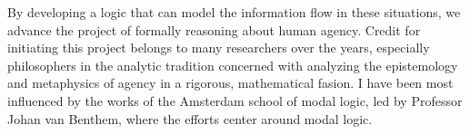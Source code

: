 By developing a logic that can model the information flow in these situations, we advance the project of formally reasoning about human agency. Credit for initiating this project belongs to many researchers over the years, especially philosophers in the analytic tradition concerned with analyzing the epistemology and metaphysics of agency in a rigorous, mathematical fasion. I have been most influenced by the works of the Amsterdam school of modal logic, led by Professor Johan van Benthem, where the efforts center around modal logic.
